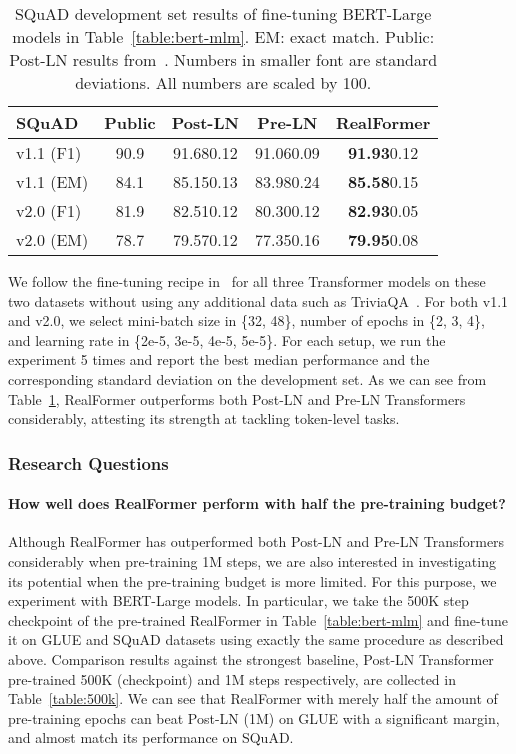 \documentclass[11pt,a4paper]{article}
\begin{document}
\begin{table}[t]
\setlength{\tabcolsep}{0.9pt}
\centering
\begin{tabular}{lcccc}
\hline \textbf{SQuAD} &\textbf{Public}  & \textbf{Post-LN} & \textbf{Pre-LN} & \textbf{RealFormer} \\ \hline
v1.1 \small{(F1)}   & 90.9  & 91.68\tiny{0.12}  & 91.06\tiny{0.09}    & \textbf{91.93}\tiny{0.12}   \\
v1.1 \small{(EM)}   & 84.1  & 85.15\tiny{0.13}  & 83.98\tiny{0.24}    & \textbf{85.58}\tiny{0.15}   \\
v2.0 \small{(F1)}   & 81.9  & 82.51\tiny{0.12}  & 80.30\tiny{0.12}    & \textbf{82.93}\tiny{0.05}   \\
v2.0 \small{(EM)}   & 78.7  & 79.57\tiny{0.12}  & 77.35\tiny{0.16}    & \textbf{79.95}\tiny{0.08}  \\
\hline
\end{tabular}
\caption{\label{table:squad} SQuAD development set results of fine-tuning BERT-Large models in Table~\ref{table:bert-mlm}. EM: exact match. Public: Post-LN results from~\citet{Devlin-2019-bert}. Numbers in smaller font are standard deviations. All numbers are scaled by 100.}
\end{table}


We follow the fine-tuning recipe in~\citet{Devlin-2019-bert} for all three Transformer models on these two datasets without using any additional data such as TriviaQA~\citep{Joshi-2017-triviaqa}.
For both v1.1 and v2.0, we select mini-batch size in \{32, 48\}, number of epochs in \{2, 3, 4\}, and learning rate in \{2e-5, 3e-5, 4e-5, 5e-5\}. For each setup, we run the experiment 5 times and report the best median performance and the corresponding standard deviation on the development set. As we can see from Table~\ref{table:squad}, RealFormer outperforms both Post-LN and Pre-LN Transformers considerably, attesting its strength at tackling token-level tasks.


\subsubsection{Research Questions} \label{sec:rq}

\paragraph{How well does RealFormer perform with half the pre-training budget?}
Although RealFormer has outperformed both Post-LN and Pre-LN Transformers considerably when pre-training 1M steps, we are also interested in investigating its potential when the pre-training budget is more limited. For this purpose, we experiment with BERT-Large models. In particular, we take the 500K step checkpoint of the pre-trained RealFormer in Table~\ref{table:bert-mlm} and fine-tune it on GLUE and SQuAD datasets using exactly the same procedure as described above. Comparison results against the strongest baseline, Post-LN Transformer pre-trained 500K (checkpoint) and 1M steps respectively, are collected in Table~\ref{table:500k}. We can see that RealFormer with merely half the amount of pre-training epochs can beat Post-LN (1M) on GLUE with a significant margin, and almost match its performance on SQuAD.
\end{document}
